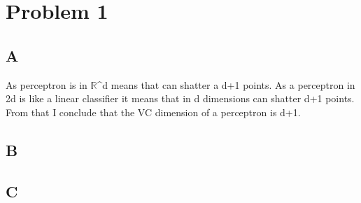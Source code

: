 \section{Problem 1}
\subsection{A}
As perceptron is in $\mathbb{R}$^d means that can shatter a d+1
points. As a perceptron in 2d is like a linear classifier it means
that in d dimensions can shatter d+1 points. From that I conclude that 
the VC dimension of a perceptron is d+1.
\subsection{B}
\subsection{C}
